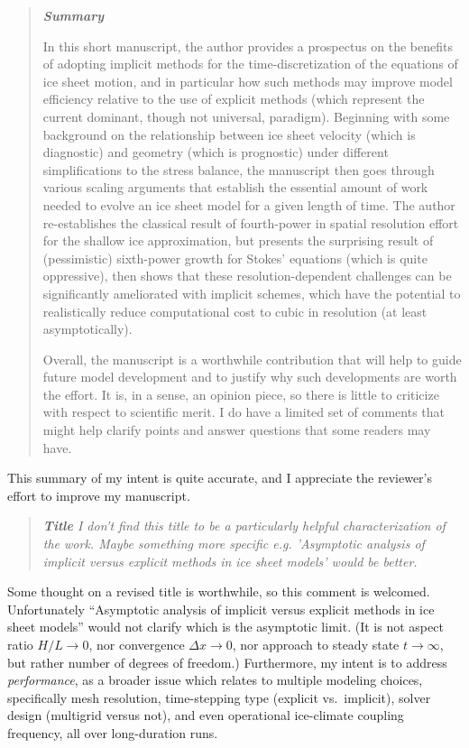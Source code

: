 \documentclass[letterpaper,final,12pt,reqno]{amsart}
\newenvironment{review}%
{\bigskip \par \begin{quote} \selectfont \sl}%
{\end{quote}}
\begin{document}
\begin{review}
\textbf{Summary}

In this short manuscript, the author provides a prospectus on the benefits of adopting implicit methods for the time-discretization of the equations of ice sheet motion, and in particular how such methods may improve model efficiency relative to the use of explicit methods (which represent the current dominant, though not universal, paradigm). Beginning with some background on the relationship between ice sheet velocity (which is diagnostic) and geometry (which is prognostic) under different simplifications to the stress balance, the manuscript then goes through various scaling arguments that establish the essential amount of work needed to evolve an ice sheet model for a given length of time. The author re-establishes the classical result of fourth-power in spatial resolution effort for the shallow ice approximation, but presents the surprising result of (pessimistic) sixth-power growth for Stokes’ equations (which is quite oppressive), then shows that these resolution-dependent challenges can be significantly ameliorated with implicit schemes, which have the potential to realistically reduce computational cost to cubic in resolution (at least asymptotically).

Overall, the manuscript is a worthwhile contribution that will help to guide future model development and to justify why such developments are worth the effort. It is, in a sense, an opinion piece, so there is little to criticize with respect to scientific merit. I do have a limited set of comments that might help clarify points and answer questions that some readers may have.
\end{review}

\noindent This summary of my intent is quite accurate, and I appreciate the reviewer's effort to improve my manuscript.

\begin{review}
\textbf{Title} I don't find this title to be a particularly helpful characterization of the work. Maybe something more specific e.g. 'Asymptotic analysis of implicit versus explicit methods in ice sheet models' would be better.
\end{review}

\noindent Some thought on a revised title is worthwhile, so this comment is welcomed.  Unfortunately ``Asymptotic analysis of implicit versus explicit methods in ice sheet models'' would not clarify which is the asymptotic limit.   (It is not aspect ratio $H/L \to 0$, nor convergence $\Delta x \to 0$, nor approach to steady state $t\to \infty$, but rather number of degrees of freedom.)  Furthermore, my intent is to address \emph{performance}, as a broader issue which relates to multiple modeling choices, specifically mesh resolution, time-stepping type (explicit vs.~implicit), solver design (multigrid versus not), and even operational ice-climate coupling frequency, all over long-duration runs.
\end{document}
